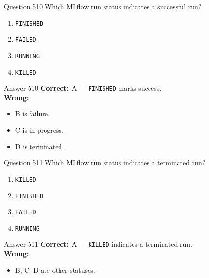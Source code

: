 \documentclass[aspectratio=169,11pt]{beamer}
\begin{document}
	\begin{frame}{Question 510}
		Which MLflow run status indicates a successful run?
		\begin{enumerate}[label=\Alph*.]
			\item \texttt{FINISHED}
			\item \texttt{FAILED}
			\item \texttt{RUNNING}
			\item \texttt{KILLED}
		\end{enumerate}
	\end{frame}
	\begin{frame}{Answer 510}
		\textbf{Correct: A} --- \texttt{FINISHED} marks success.\\
		\vspace{0.5em}
		\textbf{Wrong:}
		\begin{itemize}
			\item B is failure.
			\item C is in progress.
			\item D is terminated.
		\end{itemize}
	\end{frame}
	
	\begin{frame}{Question 511}
		Which MLflow run status indicates a terminated run?
		\begin{enumerate}[label=\Alph*.]
			\item \texttt{KILLED}
			\item \texttt{FINISHED}
			\item \texttt{FAILED}
			\item \texttt{RUNNING}
		\end{enumerate}
	\end{frame}
	\begin{frame}{Answer 511}
		\textbf{Correct: A} --- \texttt{KILLED} indicates a terminated run.\\
		\vspace{0.5em}
		\textbf{Wrong:}
		\begin{itemize}
			\item B, C, D are other statuses.
		\end{itemize}
	\end{frame}
	
\end{document}
